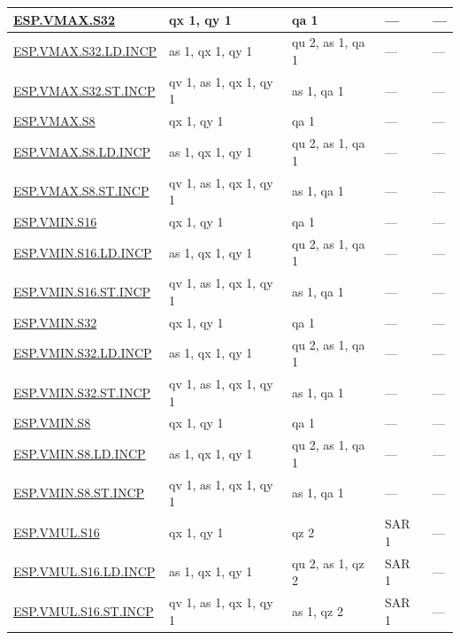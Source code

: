 \begin{longtable}[c]{|l|m{2.5cm}|m{2.5cm}|m{2.5cm}|m{2.5cm}|}
    \hyperref[instruction:ESPVMAXS32]{ESP.VMAX.S32} & qx 1, qy 1 & qa 1 & — & — \\\hline
    \hyperref[instruction:ESPVMAXS32LDINCP]{ESP.VMAX.S32.LD.INCP} & as 1, qx 1, qy 1 & qu 2, as 1, qa 1 & — & — \\\hline
    \hyperref[instruction:ESPVMAXS32STINCP]{ESP.VMAX.S32.ST.INCP} & qv 1, as 1, qx 1, qy 1 & as 1, qa 1 & — & — \\\hline
    \hyperref[instruction:ESPVMAXS8]{ESP.VMAX.S8} & qx 1, qy 1 & qa 1 & — & — \\\hline
    \hyperref[instruction:ESPVMAXS8LDINCP]{ESP.VMAX.S8.LD.INCP} & as 1, qx 1, qy 1 & qu 2, as 1, qa 1 & — & — \\\hline
    \hyperref[instruction:ESPVMAXS8STINCP]{ESP.VMAX.S8.ST.INCP} & qv 1, as 1, qx 1, qy 1 & as 1, qa 1 & — & — \\\hline
    \hyperref[instruction:ESPVMINS16]{ESP.VMIN.S16} & qx 1, qy 1 & qa 1 & — & — \\\hline
    \hyperref[instruction:ESPVMINS16LDINCP]{ESP.VMIN.S16.LD.INCP} & as 1, qx 1, qy 1 & qu 2, as 1, qa 1 & — & — \\\hline
    \hyperref[instruction:ESPVMINS16STINCP]{ESP.VMIN.S16.ST.INCP} & qv 1, as 1, qx 1, qy 1 & as 1, qa 1 & — & — \\\hline
    \hyperref[instruction:ESPVMINS32]{ESP.VMIN.S32} & qx 1, qy 1 & qa 1 & — & — \\\hline
    \hyperref[instruction:ESPVMINS32LDINCP]{ESP.VMIN.S32.LD.INCP} & as 1, qx 1, qy 1 & qu 2, as 1, qa 1 & — & — \\\hline
    \hyperref[instruction:ESPVMINS32STINCP]{ESP.VMIN.S32.ST.INCP} & qv 1, as 1, qx 1, qy 1 & as 1, qa 1 & — & — \\\hline
    \hyperref[instruction:ESPVMINS8]{ESP.VMIN.S8} & qx 1, qy 1 & qa 1 & — & — \\\hline
    \hyperref[instruction:ESPVMINS8LDINCP]{ESP.VMIN.S8.LD.INCP} & as 1, qx 1, qy 1 & qu 2, as 1, qa 1 & — & — \\\hline
    \hyperref[instruction:ESPVMINS8STINCP]{ESP.VMIN.S8.ST.INCP} & qv 1, as 1, qx 1, qy 1 & as 1, qa 1 & — & — \\\hline
    \hyperref[instruction:ESPVMULS16]{ESP.VMUL.S16} & qx 1, qy 1 & qz 2 & SAR 1 & — \\\hline
    \hyperref[instruction:ESPVMULS16LDINCP]{ESP.VMUL.S16.LD.INCP} & as 1, qx 1, qy 1 & qu 2, as 1, qz 2 & SAR 1 & — \\\hline
    \hyperref[instruction:ESPVMULS16STINCP]{ESP.VMUL.S16.ST.INCP} & qv 1, as 1, qx 1, qy 1 & as 1, qz 2 & SAR 1 & — \\\hline

\end{longtable}
